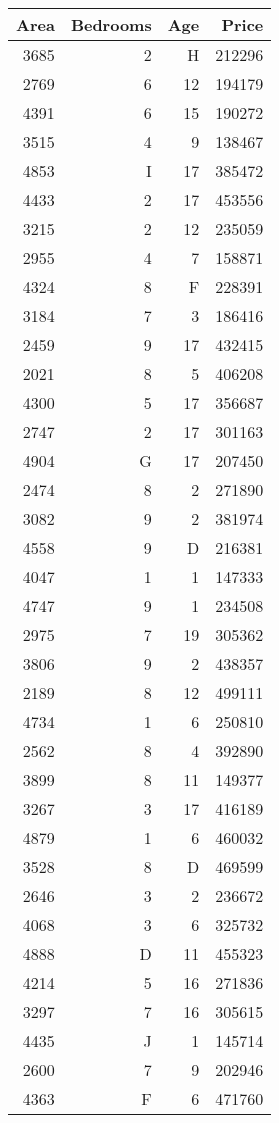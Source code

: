 \documentclass[12pt, a4paper]{report}
\begin{document}
\begin{table}[h!]
    \centering
    \begin{tabular}{|r|r|r|r|}
\hline
\textbf{Area} & \textbf{Bedrooms} & \textbf{Age} & \textbf{Price} \\
\hline
3685 & 2 & H & 212296 \\
2769 & 6 & 12 & 194179 \\
4391 & 6 & 15 & 190272 \\
3515 & 4 & 9 & 138467 \\
4853 & I & 17 & 385472 \\
4433 & 2 & 17 & 453556 \\
3215 & 2 & 12 & 235059 \\
2955 & 4 & 7 & 158871 \\
4324 & 8 & F & 228391 \\
3184 & 7 & 3 & 186416 \\
2459 & 9 & 17 & 432415 \\
2021 & 8 & 5 & 406208 \\
4300 & 5 & 17 & 356687 \\
2747 & 2 & 17 & 301163 \\
4904 & G & 17 & 207450 \\
2474 & 8 & 2 & 271890 \\
3082 & 9 & 2 & 381974 \\
4558 & 9 & D & 216381 \\
4047 & 1 & 1 & 147333 \\
4747 & 9 & 1 & 234508 \\
2975 & 7 & 19 & 305362 \\
3806 & 9 & 2 & 438357 \\
2189 & 8 & 12 & 499111 \\
4734 & 1 & 6 & 250810 \\
2562 & 8 & 4 & 392890 \\
3899 & 8 & 11 & 149377 \\
3267 & 3 & 17 & 416189 \\
4879 & 1 & 6 & 460032 \\
3528 & 8 & D & 469599 \\
2646 & 3 & 2 & 236672 \\
4068 & 3 & 6 & 325732 \\
4888 & D & 11 & 455323 \\
4214 & 5 & 16 & 271836 \\
3297 & 7 & 16 & 305615 \\
4435 & J & 1 & 145714 \\
2600 & 7 & 9 & 202946 \\
4363 & F & 6 & 471760 \\
\hline
    \end{tabular}
\end{table}
\newpage
\end{document}
